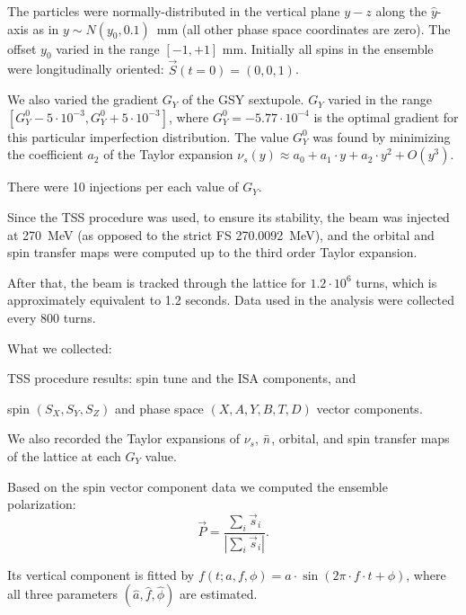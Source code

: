 The particles were normally-distributed in the vertical plane $y-z$ along the $\hat y$-axis
as in $y\sim N(y_0, 0.1)$~mm (all other phase space coordinates are zero). The offset $y_0$ varied in the
range $[-1, +1]$ mm. Initially all spins in the ensemble were longitudinally oriented: $\vec S(t=0) = (0,0,1)$.

We also varied the gradient $G_Y$ of the GSY sextupole.
$G_Y$ varied in the range $[G_Y^0 - 5\cdot10^{-3}, G_Y^0 + 5\cdot10^{-3}]$, where
$G_Y^0=-5.77\cdot 10^{-4}$ is the optimal gradient for this particular imperfection distribution.
The value $G_Y^0$ was found by minimizing the coefficient $a_2$
of the Taylor expansion $\nu_s(y) \approx a_0 + a_1\cdot y + a_2\cdot y^2 + O(y^3)$.

There were 10 injections per each value of $G_Y$.

Since the TSS procedure was used, to ensure its stability,
the beam was injected at 270~MeV (as opposed to the strict FS 270.0092~MeV), and the orbital and
spin transfer maps were computed up to the third order Taylor expansion. 

After that, the beam is tracked through the lattice for $1.2\cdot10^6$ turns, which is approximately
equivalent to 1.2 seconds. Data used in the analysis were collected every 800 turns.

What we collected:
\begin{enumerate*}[(a)]
	\item TSS procedure results: spin tune and the ISA components, and
	\item spin $(S_X, S_Y, S_Z)$ and phase space $(X,A,Y,B,T,D)$ vector components.
\end{enumerate*}
We also recorded the Taylor expansions of $\nu_s$, $\bar n$, orbital, and spin transfer maps
of the lattice at each $G_Y$ value.

Based on the spin vector component data we computed the ensemble polarization:
\begin{equation}\label{eq:polarization_formula}
\vec P = \frac{\sum_i\vec s_i}{|\sum_i\vec s_i|}.
\end{equation}

Its vertical component is fitted by $f(t; a,f,\phi) = a\cdot \sin(2\pi\cdot
f\cdot t + \phi)$, where all three parameters $(\hat a, \hat f, \hat\phi)$ are estimated.  

